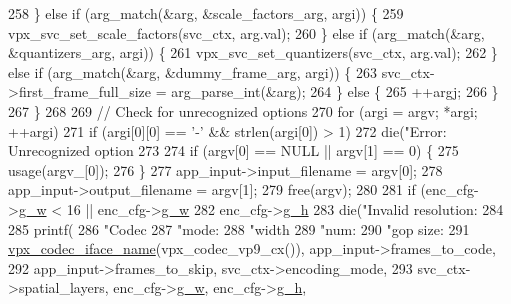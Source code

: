 \begin{DoxyCodeInclude}
{{{{258     \} \textcolor{keywordflow}{else} \textcolor{keywordflow}{if} (arg\_match(&arg, &scale\_factors\_arg, argi)) \{
259       vpx\_svc\_set\_scale\_factors(svc\_ctx, arg.val);
260     \} \textcolor{keywordflow}{else} \textcolor{keywordflow}{if} (arg\_match(&arg, &quantizers\_arg, argi)) \{
261       vpx\_svc\_set\_quantizers(svc\_ctx, arg.val);
262     \} \textcolor{keywordflow}{else} \textcolor{keywordflow}{if} (arg\_match(&arg, &dummy\_frame\_arg, argi)) \{
263       svc\_ctx->first\_frame\_full\_size = arg\_parse\_int(&arg);
264     \} \textcolor{keywordflow}{else} \{
265       ++argj;
266     \}
267   \}
268 
269   \textcolor{comment}{// Check for unrecognized options}
270   \textcolor{keywordflow}{for} (argi = argv; *argi; ++argi)
271     \textcolor{keywordflow}{if} (argi[0][0] == \textcolor{charliteral}{'-'} && strlen(argi[0]) > 1)
272       die(\textcolor{stringliteral}{"Error: Unrecognized option %
273 
274   \textcolor{keywordflow}{if} (argv[0] == NULL || argv[1] == 0) \{
275     usage(argv\_[0]);
276   \}
277   app\_input->input\_filename = argv[0];
278   app\_input->output\_filename = argv[1];
279   free(argv);
280 
281   \textcolor{keywordflow}{if} (enc\_cfg->\hyperlink{structvpx__codec__enc__cfg_a5c165f5b41ca1158f2883983a2b7709c}{g\_w} < 16 || enc\_cfg->\hyperlink{structvpx__codec__enc__cfg_a5c165f5b41ca1158f2883983a2b7709c}{g\_w} %
282       enc\_cfg->\hyperlink{structvpx__codec__enc__cfg_a4132bd89ce85bce7c08f2cc3b6f2b82e}{g\_h} %
283     die(\textcolor{stringliteral}{"Invalid resolution: %
284 
285   printf(
286       \textcolor{stringliteral}{"Codec %
287       \textcolor{stringliteral}{"mode: %
288       \textcolor{stringliteral}{"width %
289       \textcolor{stringliteral}{"num: %
290       \textcolor{stringliteral}{"gop size: %
291       \hyperlink{group__codec_ga9eee39f450d8cdcf5aba0e2bda6e5aa8}{vpx\_codec\_iface\_name}(vpx\_codec\_vp9\_cx()), app\_input->frames\_to\_code,
292       app\_input->frames\_to\_skip, svc\_ctx->encoding\_mode,
293       svc\_ctx->spatial\_layers, enc\_cfg->\hyperlink{structvpx__codec__enc__cfg_a5c165f5b41ca1158f2883983a2b7709c}{g\_w}, enc\_cfg->\hyperlink{structvpx__codec__enc__cfg_a4132bd89ce85bce7c08f2cc3b6f2b82e}{g\_h},
}}}}}}}}}}}
\end{DoxyCodeInclude}
